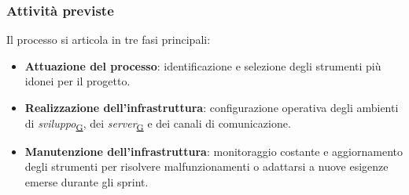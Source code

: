 \documentclass[a4paper,12pt]{article}
\begin{document}
        \subsubsection{Attività previste}
            Il processo si articola in tre fasi principali:
            \begin{itemize}
                \item \textbf{Attuazione del processo}: identificazione e selezione degli strumenti più idonei per il progetto.
                \item \textbf{Realizzazione dell'infrastruttura}: configurazione operativa degli ambienti di \textit{sviluppo}\textsubscript{\href{https://atlasteam9.github.io/Atlas/glossario.html\#Sviluppo}{G}}, dei \textit{server}\textsubscript{\href{https://atlasteam9.github.io/Atlas/glossario.html\#Server}{G}} e dei canali di comunicazione.
                \item \textbf{Manutenzione dell'infrastruttura}: monitoraggio costante e aggiornamento degli strumenti per risolvere malfunzionamenti o adattarsi a nuove esigenze emerse durante gli sprint.
            \end{itemize}
            
\end{document}
